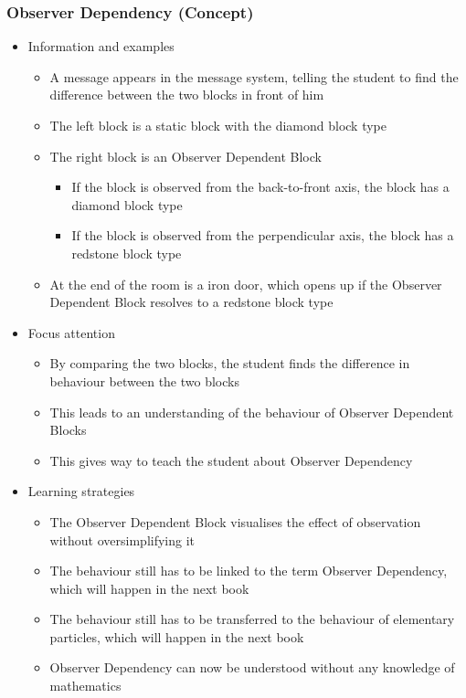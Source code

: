 \documentclass[11pt,twoside]{report} %
\begin{document}
\subsubsection{Observer Dependency (Concept)}
	\begin{itemize}
		\item Information and examples
		\begin{itemize}
			\item A message appears in the message system, telling the student to find the difference between the two blocks in front of him
			\item The left block is a static block with the diamond block type
			\item The right block is an Observer Dependent Block
			\begin{itemize}
				\item If the block is observed from the back-to-front axis, the block has a diamond block type
				\item If the block is observed from the perpendicular axis, the block has a redstone block type
			\end{itemize}
			\item At the end of the room is a iron door, which opens up if the Observer Dependent Block resolves to a redstone block type
		\end{itemize}
		\item Focus attention
		\begin{itemize}
			\item By comparing the two blocks, the student finds the difference in behaviour between the two blocks
			\item This leads to an understanding of the behaviour of Observer Dependent Blocks
			\item This gives way to teach the student about Observer Dependency
		\end{itemize}
		\item Learning strategies
		\begin{itemize}
			\item The Observer Dependent Block visualises the effect of observation without oversimplifying it
			\item The behaviour still has to be linked to the term Observer Dependency, which will happen in the next book
			\item The behaviour still has to be transferred to the behaviour of elementary particles, which will happen in the next book
			\item Observer Dependency can now be understood without any knowledge of mathematics

\end{itemize}
\end{itemize}
\end{document}
